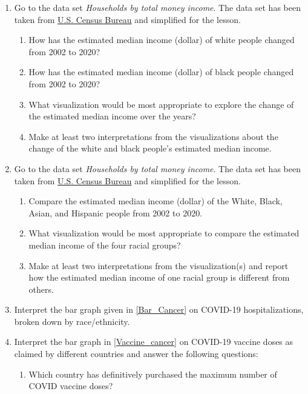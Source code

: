 \documentclass[a4paper, 11pt]{article}
\begin{document}
\begin{enumerate}[font=\bfseries]
		\item 
				Go to the data set \emph{Households by total money income}. The data set has been taken from \href{https://www.census.gov/data/tables/2021/demo/income-poverty/p60-273.html}{U.S. Census Bureau} and simplified for the lesson.
				\begin{enumerate}[label=\alph*), itemsep=0.5ex]
					\item How has the estimated median income (dollar) of white people changed from 2002 to 2020?
					\item How has the estimated median income (dollar) of black people changed from 2002 to 2020?
					\item What visualization would be most appropriate to explore the change of the estimated median income over the years?
					\item Make at least two interpretations from the visualizations about the change of the white and black people's estimated median income.
				\end{enumerate}
		\item 
				Go to the data set \emph{Households by total money income}. The data set has been taken from \href{https://www.census.gov/data/tables/2021/demo/income-poverty/p60-273.html}{U.S. Census Bureau} and simplified for the lesson.
				\begin{enumerate}[label=\alph*), itemsep=0.5ex]
					\item Compare the estimated median income (dollar) of the White, Black, Asian, and Hispanic people from 2002 to 2020. 
					\item What visualization would be most appropriate to compare the estimated median income of the four racial groups?
					\item Make at least two interpretations from the visualization(s) and report how the estimated median income of one racial group is different from others.
				\end{enumerate}
		\item 
				Interpret the bar graph given in \vref{Bar_Cancer} on COVID-19 hospitalizations, broken down by race/ethnicity.
		\item 
				Interpret the bar graph in \vref{Vaccine_cancer} on COVID-19 vaccine doses as claimed by different countries and answer the following questions:
				\begin{enumerate}[label=\alph*), itemsep=0.5ex]
					\item Which country has definitively purchased the maximum number of COVID vaccine doses? 

\end{enumerate}
\end{enumerate}
\end{document}
